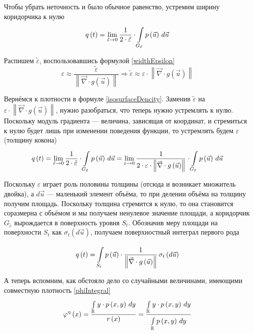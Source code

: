 Чтобы убрать неточность и было обычное равенство,
устремим ширину коридорчика к нулю
\begin{equation}\label{isosurfaceDencity}
    q\left( t \right)
        = \lim_{\tilde{\varepsilon} \to 0} \frac{1}{2 \cdot \tilde{\varepsilon}}
            \cdot \integrall{G_{\tilde{\varepsilon}}}{d\vec{u}}{\pdf{\vec{u}}}
\end{equation}

Распишем $\tilde{\varepsilon}$, воспользовавшись формулой \eqref{widthEpsilon}
$$\varepsilon
    \approx \frac{\tilde{\varepsilon}}
        {\left\| \vec{\nabla} \cdot {g\left( \vec{u} \right)} \right\|}
    \Rightarrow
        \tilde{\varepsilon} \approx \varepsilon
            \cdot \left\| \vec{\nabla} \cdot g\left( \vec{u} \right) \right\|$$

Вернёмся к плотности в формуле \eqref{isosurfaceDencity}.
Заменив $\tilde{\varepsilon}$ на $\varepsilon
\cdot \left\| \vec{\nabla} \cdot g\left( \vec{u} \right) \right\|$,
нужно разобраться, что теперь нужно устремлять к нулю.
Поскольку модуль градиента --- величина, зависящая от координат,
и стремиться к нулю будет лишь при изменении поведения функции,
то устремлять будем $\varepsilon$ (толщину кокона)
$$q\left( t \right)
        = \lim_{\tilde{\varepsilon} \to 0} \frac{1}{2 \cdot \tilde{\varepsilon}}
            \cdot \integrall{G_{\tilde{\varepsilon}}}{d\vec{u}}{\pdf{\vec{u}}}
        = \lim_{\varepsilon \to 0} \frac{1}{2 \cdot \varepsilon
            \cdot \left\| \vec{\nabla} \cdot g\left( \vec{u} \right) \right\|}
            \cdot \integrall{G_{\tilde{\varepsilon}}}{d\vec{u}}{\pdf{\vec{u}}}$$

Поскольку $\varepsilon$ играет роль половины толщины
(отсюда и возникает множитель двойка),
а $d\vec{u}$ --- маленький элемент объёма,
то при делении объёма на толщину получим площадь.
Поскольку толщина стремится к нулю,
то она становится соразмерна с объёмом и мы получаем ненулевое значение площади,
а коридорчик $G_{\tilde{\varepsilon}}$ вырождается в поверхность уровня $S_t$.
Обозначив меру площади на поверхности $S_t$ как
$\sigma_{t}\left( d\vec{u} \right)$,
получаем поверхностный интеграл первого рода

$$q\left( t \right)
    = \integrall{S_t}{\sigma_{t}\left(d\vec{u} \right)}{
        \pdf{\vec{u}} \cdot \frac{1}
            {\left\| \vec{\nabla} \cdot g\left( \vec{u} \right) \right\|}}$$

А теперь вспомним, как обстояло дело со случайными величинами,
имеющими совместную плотность \eqref{phiIntegral}
$$\varphi^{\eta}\left( x \right)
    = \frac{\integral{\mathbb{R}}{}{y}{y \cdot \pdf{x,y}}}
        {r\left( x \right)}
    = \frac{\integral{\mathbb{R}}{}{y}{y \cdot \pdf{x,y}}}
        {\integral{\mathbb{R}}{}{y}{\pdf{x,y}}}$$

